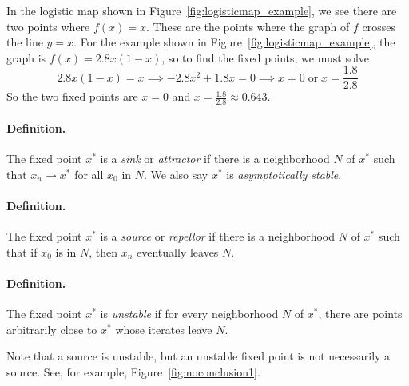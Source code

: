 \documentclass{book}
\begin{document}
In the logistic map shown in Figure~\ref{fig:logisticmap_example},
we see there are two
points where $f(x)=x$.  These are the points
where the graph of $f$ crosses the line $y=x$.
For the example shown in Figure~\ref{fig:logisticmap_example},
the graph is $f(x) = 2.8x(1-x)$, so to find the fixed points,
we must solve
\begin{equation}
  2.8x(1-x) = x \implies -2.8x^2 + 1.8x = 0
  \implies x = 0 \;\textrm{or}\; x = \frac{1.8}{2.8}
\end{equation}
So the two fixed points are $x=0$ and $x=\frac{1.8}{2.8}\approx 0.643$.

\paragraph{Definition.}
The fixed point $x^*$ is a \emph{sink} or \emph{attractor}
if there is a neighborhood $N$ of $x^*$ such that
$x_n\rightarrow x^*$ for all $x_0$ in $N$.
We also say $x^*$ is \emph{asymptotically stable}.

\paragraph{Definition.}
The fixed point $x^*$ is a \emph{source} or \emph{repellor}
if there is a neighborhood $N$ of $x^*$ such that if $x_0$
is in $N$, then $x_n$ eventually leaves $N$.

\paragraph{Definition.}
The fixed point $x^*$ is \emph{unstable} if for every
neighborhood $N$ of $x^*$, there are points arbitrarily close
to $x^*$ whose iterates leave $N$.

\vspace{0.2cm}
Note that a source is unstable, but an unstable fixed point
is not necessarily a source.  See, for example,
Figure~\ref{fig:noconclusion1}.
\end{document}
